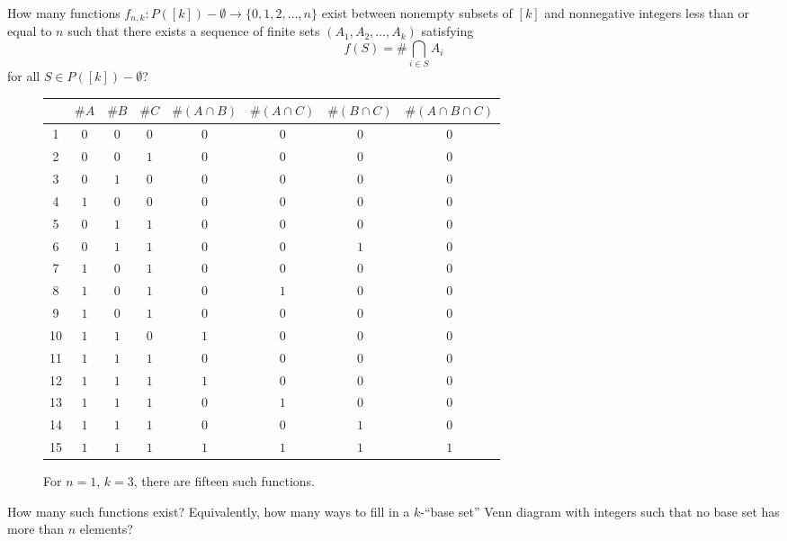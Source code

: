 \documentclass{article}
\begin{document}
How many functions $f_{n, k}\colon P([k]) - \emptyset \rightarrow \{ 0, 1, 2, \hdots, n \}$
exist between nonempty subsets of $[k]$ and nonnegative integers less than or
equal to $n$ such that there exists a sequence of finite sets
$(A_1, A_2, \hdots, A_k)$ satisfying \[
  f(S) = \#\bigcap_{i \in S} A_i
\] for all $S \in P([k]) - \emptyset$?
\begin{figure}[ht!]
  \centering
    \begin{tabular}{|c||c|c|c|c|c|c|c|}
      \hline
         & $\#A$ & $\#B$ & $\#C$ & $\#(A \cap B)$ & $\#(A \cap C)$ & $\#(B \cap C)$ & $\#(A \cap B \cap C)$\\ \hline
      1  & $0$   & $0$   & $0$   & $0$            & $0$            & $0$            &  $0$\\
      2  & $0$   & $0$   & $1$   & $0$            & $0$            & $0$            &  $0$\\
      3  & $0$   & $1$   & $0$   & $0$            & $0$            & $0$            &  $0$\\
      4  & $1$   & $0$   & $0$   & $0$            & $0$            & $0$            &  $0$\\
      5  & $0$   & $1$   & $1$   & $0$            & $0$            & $0$            &  $0$\\
      6  & $0$   & $1$   & $1$   & $0$            & $0$            & $1$            &  $0$\\
      7  & $1$   & $0$   & $1$   & $0$            & $0$            & $0$            &  $0$\\
      8  & $1$   & $0$   & $1$   & $0$            & $1$            & $0$            &  $0$\\
      9  & $1$   & $0$   & $1$   & $0$            & $0$            & $0$            &  $0$\\
      10 & $1$   & $1$   & $0$   & $1$            & $0$            & $0$            &  $0$\\
      11 & $1$   & $1$   & $1$   & $0$            & $0$            & $0$            &  $0$\\
      12 & $1$   & $1$   & $1$   & $1$            & $0$            & $0$            &  $0$\\
      13 & $1$   & $1$   & $1$   & $0$            & $1$            & $0$            &  $0$\\
      14 & $1$   & $1$   & $1$   & $0$            & $0$            & $1$            &  $0$\\
      15 & $1$   & $1$   & $1$   & $1$            & $1$            & $1$            &  $1$\\
      \hline
    \end{tabular}
  \caption{
    For $n=1$, $k=3$, there are fifteen such functions.
  }
\end{figure}
\begin{question}
  How many such functions exist? Equivalently, how many ways to fill in a
  $k$-``base set'' Venn diagram with integers such that no base set has more
  than $n$ elements?
\end{question}
\end{document}
